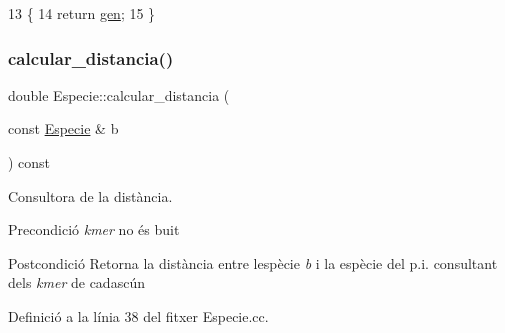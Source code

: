 \begin{DoxyCode}
13                                     \{
14     \textcolor{keywordflow}{return} \hyperlink{class_especie_ac35bb565f7346cd6317b3a8c849456d1}{gen};
15 \}
\end{DoxyCode}
\mbox{\label{class_especie_aa7556bc4f5e708a9f918125614ecbb38}} 
\subsubsection{\texorpdfstring{calcular\+\_\+distancia()}{calcular\_distancia()}}
{\footnotesize\ttfamily double Especie\+::calcular\+\_\+distancia (\begin{DoxyParamCaption}\item[{const \hyperlink{class_especie}{Especie} \&}]{b }\end{DoxyParamCaption}) const}



Consultora de la distància. 

\begin{DoxyPrecond}{Precondició}
{\itshape kmer} no és buit 
\end{DoxyPrecond}
\begin{DoxyPostcond}{Postcondició}
Retorna la distància entre l\textquotesingle{}espècie {\itshape b} i la espècie del p.\+i. consultant dels {\itshape kmer} de cadascún 
\end{DoxyPostcond}


Definició a la línia 38 del fitxer Especie.\+cc.



